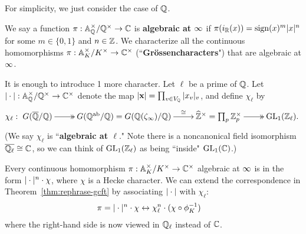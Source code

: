 For simplicity, we just consider the case of $\mathbb{Q}$.
\begin{ex}
We say a function $\pi:\mathbb{A}_{\mathbb{Q}}^{\times}/\mathbb{Q}^{\times}\to \mathbb{C}$ is \textbf{algebraic at $\infty$} if $\pi(i_{\mathbb{R}}(x))=\operatorname{sign}(x)^m|x|^n$ for some $m\in \{0,1\}$ and $n\in \mathbb{Z}$. We characterize all the continuous homomorphisms $\pi:\mathbb{A}_K^{\times}/K^{\times}\to \mathbb{C}^{\times}$ (``\textbf{Gr\"ossencharacters}") that are algebraic at $\infty$.

It is enough to introduce 1 more character. 
Let $\ell$ be a prime of $\mathbb{Q}$. Let $|\cdot|:\mathbb{A}_{\mathbb{Q}}^{\times}/\mathbb{Q}^{\times}\to \mathbb{C}^{\times}$ denote the map $\left| {\mathbf x} \right|=\prod_{v\in V_{\mathbb{Q}}} |x_v|_v$, and define $\chi_{\ell}$ by
\[
\chi_{\ell}:\xymatrix{
G(\ol{\Q}/\Q) \ar@{->>}[r] &
G(\Q\abe/\Q)=G(\Q(\ze_{\iy})/\Q)\ar[r]^-{\cong} &
\wh{\Z}^{\times}=\prod_p\Z_p^{\times} \ar@{->>}[r] &
\GL_1(\Z_{\ell}).
}
\]
(We say $\chi_{\ell}$ is ``\textbf{algebraic at $\ell$}." Note there is a noncanonical field isomorphism $\overline{\mathbb{Q}_{\ell}}\cong \mathbb{C}$, so we can think of $\operatorname{GL}_1(\mathbb{Z}_{\ell})$ as being ``inside" $\operatorname{GL}_1(\mathbb{C})$.)

Every continuous homomorphism $\pi:\mathbb{A}_K^{\times}/K^{\times}\to \mathbb{C}^{\times}$ algebraic at $\infty$ is in the form $|\cdot|^n\cdot \chi$, where $\chi$ is a Hecke character. We can extend the correspondence in Theorem~\ref{thm:rephrase-gcft} by associating $|\cdot|$ with $\chi_{\ell}$:
%
\begin{align*}
\pi=|\cdot|^n\cdot \chi&\leftrightarrow \chi_{\ell}^n
\cdot (\chi\circ \phi_K^{-1})
\end{align*}
where the right-hand side is now viewed in $\mathbb{Q}_{\ell}$ instead of $\mathbb{C}$.
\end{ex}
